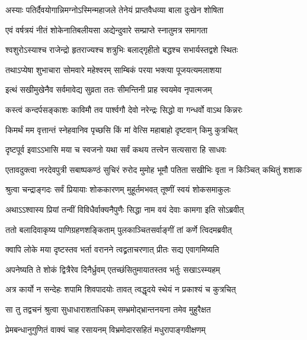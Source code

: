 \begin{center}
\twolineshloka
{अस्याः पतिर्दैवयोगान्निमग्नोऽस्मिन्महाजले}
{तेनेयं प्राप्तवैधव्या बाला दुःखेन शोषिता} %

\twolineshloka
{एवं वर्षत्रयं नीतं शोकेनातिबलीयसा}
{अद्येन्दुवारे सम्प्राप्ते स्नातुमत्र समागता} %

\twolineshloka
{श्वशुरोऽस्याश्च राजेन्द्रो हृतराज्यश्च शत्रुभिः}
{बलाद्गृहीतो बद्धश्च सभार्यस्तद्वशे स्थितः} %

\twolineshloka
{तथाऽप्येषा शुभाचारा सोमवारे महेश्वरम्}
{साम्बिकं परया भक्त्या पूजयत्यमलाशया} %

\twolineshloka
{इत्थं सखीमुखेनैव सर्वमावेद्य सुव्रता}
{ततः सीमन्तिनी प्राह स्वयमेव नृपात्मजम्} %

\twolineshloka
{कस्त्वं कन्दर्पसङ्काशः काविमौ तव पार्श्वगौ}
{देवो नरेन्द्रः सिद्धो वा गन्धर्वो वाऽथ किन्नरः} %

\twolineshloka
{किमर्थं मम वृत्तान्तं स्नेहवानिव पृच्छसि}
{किं मां वेत्सि महाबाहो दृष्टवान् किमु कुत्रचित्} %

\twolineshloka
{दृष्टपूर्व इवाऽऽभासि मया च स्वजनो यथा}
{सर्वं कथय तत्त्वेन सत्यसारा हि साधवः} %

\fourlineindentedshloka
{एतावदुक्त्वा नरदेवपुत्री}
{सबाष्पकण्ठं सुचिरं रुरोद}
{मुमोह भूमौ पतिता सखीभिः}
{वृता न किञ्चित् कथितुं शशाक} %

\twolineshloka
{श्रुत्वा चन्द्राङ्गदः सर्वं प्रियायाः शोककारणम्}
{मुहूर्तमभवत् तूष्णीं स्वयं शोकसमाकुलः} %

\twolineshloka
{अथाऽऽश्वास्य प्रियां तन्वीं विविधैर्वाक्यनैपुणैः}
{सिद्धा नाम वयं देवाः कामगा इति सोऽब्रवीत्} %

\twolineshloka
{ततो बलादिवाकृष्य पाणिग्रहणशङ्किताम्}
{पुलकाञ्चितसर्वाङ्गीं तां कर्णे त्विदमब्रवीत्} %

\twolineshloka
{क्वापि लोके मया दृष्टस्तव भर्ता वरानने}
{त्वद्व्रताचरणात् प्रीतः सद्य एवागमिष्यति} %

\twolineshloka
{अपनेष्यति ते शोकं द्वित्रैरेव दिनैर्ध्रुवम्}
{एतच्छंसितुमायातस्तव भर्तुः सखाऽस्म्यहम्} %

\twolineshloka
{अत्र कार्यो न सन्देहः शपामि शिवपादयोः}
{तावत् त्वद्धृदये स्थेयं न प्रकाश्यं च कुत्रचित्} %

\twolineshloka
{सा तु तद्वचनं श्रुत्वा सुधाधाराशताधिकम्}
{सम्भ्रमोद्भ्रान्तनयना तमेव मुहुरैक्षत} %

\twolineshloka
{प्रेमबन्धानुगुणितं वाक्यं चाह रसायनम्}
{विभ्रमोदारसहितं मधुरापाङ्गवीक्षणम्} %


\end{center}
